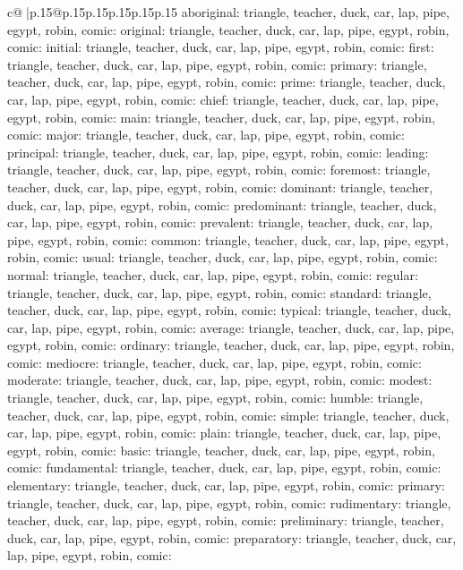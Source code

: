 \documentclass{article}
\begin{document}
{\begin{supertabular}{c@{$\;$}|p{.15\linewidth}@{}p{.15\linewidth}p{.15\linewidth}p{.15\linewidth}p{.15\linewidth}p{.15\linewidth}}
{{{aboriginal\nTARGETS: triangle, teacher, duck, car, lap, pipe, egypt, robin, comic\n\nCLUE: original\nTARGETS: triangle, teacher, duck, car, lap, pipe, egypt, robin, comic\n\nCLUE: initial\nTARGETS: triangle, teacher, duck, car, lap, pipe, egypt, robin, comic\n\nCLUE: first\nTARGETS: triangle, teacher, duck, car, lap, pipe, egypt, robin, comic\n\nCLUE: primary\nTARGETS: triangle, teacher, duck, car, lap, pipe, egypt, robin, comic\n\nCLUE: prime\nTARGETS: triangle, teacher, duck, car, lap, pipe, egypt, robin, comic\n\nCLUE: chief\nTARGETS: triangle, teacher, duck, car, lap, pipe, egypt, robin, comic\n\nCLUE: main\nTARGETS: triangle, teacher, duck, car, lap, pipe, egypt, robin, comic\n\nCLUE: major\nTARGETS: triangle, teacher, duck, car, lap, pipe, egypt, robin, comic\n\nCLUE: principal\nTARGETS: triangle, teacher, duck, car, lap, pipe, egypt, robin, comic\n\nCLUE: leading\nTARGETS: triangle, teacher, duck, car, lap, pipe, egypt, robin, comic\n\nCLUE: foremost\nTARGETS: triangle, teacher, duck, car, lap, pipe, egypt, robin, comic\n\nCLUE: dominant\nTARGETS: triangle, teacher, duck, car, lap, pipe, egypt, robin, comic\n\nCLUE: predominant\nTARGETS: triangle, teacher, duck, car, lap, pipe, egypt, robin, comic\n\nCLUE: prevalent\nTARGETS: triangle, teacher, duck, car, lap, pipe, egypt, robin, comic\n\nCLUE: common\nTARGETS: triangle, teacher, duck, car, lap, pipe, egypt, robin, comic\n\nCLUE: usual\nTARGETS: triangle, teacher, duck, car, lap, pipe, egypt, robin, comic\n\nCLUE: normal\nTARGETS: triangle, teacher, duck, car, lap, pipe, egypt, robin, comic\n\nCLUE: regular\nTARGETS: triangle, teacher, duck, car, lap, pipe, egypt, robin, comic\n\nCLUE: standard\nTARGETS: triangle, teacher, duck, car, lap, pipe, egypt, robin, comic\n\nCLUE: typical\nTARGETS: triangle, teacher, duck, car, lap, pipe, egypt, robin, comic\n\nCLUE: average\nTARGETS: triangle, teacher, duck, car, lap, pipe, egypt, robin, comic\n\nCLUE: ordinary\nTARGETS: triangle, teacher, duck, car, lap, pipe, egypt, robin, comic\n\nCLUE: mediocre\nTARGETS: triangle, teacher, duck, car, lap, pipe, egypt, robin, comic\n\nCLUE: moderate\nTARGETS: triangle, teacher, duck, car, lap, pipe, egypt, robin, comic\n\nCLUE: modest\nTARGETS: triangle, teacher, duck, car, lap, pipe, egypt, robin, comic\n\nCLUE: humble\nTARGETS: triangle, teacher, duck, car, lap, pipe, egypt, robin, comic\n\nCLUE: simple\nTARGETS: triangle, teacher, duck, car, lap, pipe, egypt, robin, comic\n\nCLUE: plain\nTARGETS: triangle, teacher, duck, car, lap, pipe, egypt, robin, comic\n\nCLUE: basic\nTARGETS: triangle, teacher, duck, car, lap, pipe, egypt, robin, comic\n\nCLUE: fundamental\nTARGETS: triangle, teacher, duck, car, lap, pipe, egypt, robin, comic\n\nCLUE: elementary\nTARGETS: triangle, teacher, duck, car, lap, pipe, egypt, robin, comic\n\nCLUE: primary\nTARGETS: triangle, teacher, duck, car, lap, pipe, egypt, robin, comic\n\nCLUE: rudimentary\nTARGETS: triangle, teacher, duck, car, lap, pipe, egypt, robin, comic\n\nCLUE: preliminary\nTARGETS: triangle, teacher, duck, car, lap, pipe, egypt, robin, comic\n\nCLUE: preparatory\nTARGETS: triangle, teacher, duck, car, lap, pipe, egypt, robin, comic\n\nCLUE: }}}
\end{supertabular}}
\end{document}
